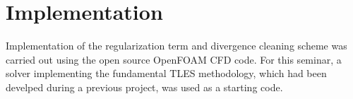 \chapter{Implementation}


Implementation of the regularization term and divergence cleaning scheme was carried out using the open source OpenFOAM CFD code. For this seminar, a solver implementing the fundamental TLES methodology, which had been develped during a previous project, was used as a starting code.